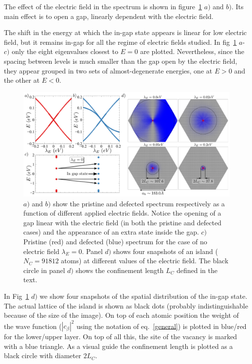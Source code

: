 The effect of the electric field in the spectrum is shown in figure~\ref{1vac_spec} $a)$ and $b)$. Its main effect is to open a gap, linearly dependent with the electric field.

The shift in the energy at which the in-gap state appears is linear for low electric field, but it remains in-gap for all the regime of electric fields studied. In fig~\ref{1vac_spec} $a$-$c)$ only the eight eigenvalues closest to $E=0$ are plotted. Nevertheless, since the spacing between levels is much smaller than the gap open by the electric field, they appear grouped in two sets of almost-degenerate energies, one at $E>0$ and the other at $E<0$.\\

\begin{figure}[!ht!]
\centering
\includegraphics[width=\textwidth]{chapter06/figures/single_vac_spectrum.pdf}
\vspace{-15pt}
\caption{$a)$ and $b)$ show the pristine and defected spectrum respectively as a function of different applied electric fields. Notice the opening of a gap linear with the electric field (in both the pristine and defected cases) and the appearance of an extra state inside the gap. $c)$ Pristine (red) and defected (blue) spectrum for the case of no electric field $\lambda_E=0$. Panel $d)$ shows four snapshots of an island ($N_C=91812$ atoms) at different values of the electric field. The black circle in panel $d)$ shows the confinement length $L_C$ defined in the text.}
\label{1vac_spec}
\end{figure}
\FloatBarrier

In Fig~\ref{1vac_spec} $d)$ we show four snapshots of the spatial distribution of the in-gap state. The actual lattice of the island is shown as black dots (probably indistinguishable because of the size of the image).
On top of each atomic position the weight of the wave function ($|c_\beta|^2$ using the notation of eq.~\eqref{general}) is plotted in blue/red for the lower/upper layer.
On top of all this, the site of the vacancy is marked with a blue triangle.
As a visual guide the confinement length is plotted as a black circle with diameter $2L_C$.\\

